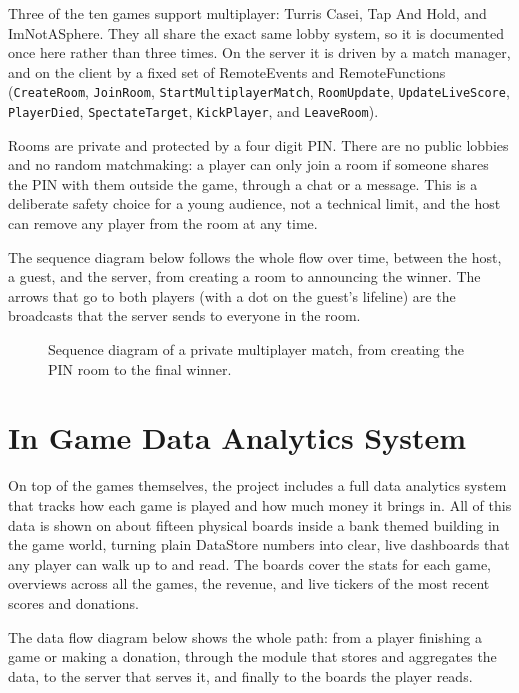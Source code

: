 \documentclass[12pt,letterpaper]{article}
\begin{document}
Three of the ten games support multiplayer: Turris Casei, Tap And Hold, and ImNotASphere. They all share the exact same lobby system, so it is documented once here rather than three times. On the server it is driven by a match manager, and on the client by a fixed set of RemoteEvents and RemoteFunctions (\texttt{CreateRoom}, \texttt{JoinRoom}, \texttt{StartMultiplayerMatch}, \texttt{RoomUpdate}, \texttt{UpdateLiveScore}, \texttt{PlayerDied}, \texttt{SpectateTarget}, \texttt{KickPlayer}, and \texttt{LeaveRoom}).

Rooms are private and protected by a four digit PIN. There are no public lobbies and no random matchmaking: a player can only join a room if someone shares the PIN with them outside the game, through a chat or a message. This is a deliberate safety choice for a young audience, not a technical limit, and the host can remove any player from the room at any time.

The sequence diagram below follows the whole flow over time, between the host, a guest, and the server, from creating a room to announcing the winner. The arrows that go to both players (with a dot on the guest's lifeline) are the broadcasts that the server sends to everyone in the room.

\begin{figure}[H]
  \centering
  
  \caption{Sequence diagram of a private multiplayer match, from creating the PIN room to the final winner.}
  \label{fig:sequence_multiplayer}
\end{figure}

\clearpage



\section{In Game Data Analytics System}

On top of the games themselves, the project includes a full data analytics system that tracks how each game is played and how much money it brings in. All of this data is shown on about fifteen physical boards inside a bank themed building in the game world, turning plain DataStore numbers into clear, live dashboards that any player can walk up to and read. The boards cover the stats for each game, overviews across all the games, the revenue, and live tickers of the most recent scores and donations.

The data flow diagram below shows the whole path: from a player finishing a game or making a donation, through the module that stores and aggregates the data, to the server that serves it, and finally to the boards the player reads.
\end{document}
